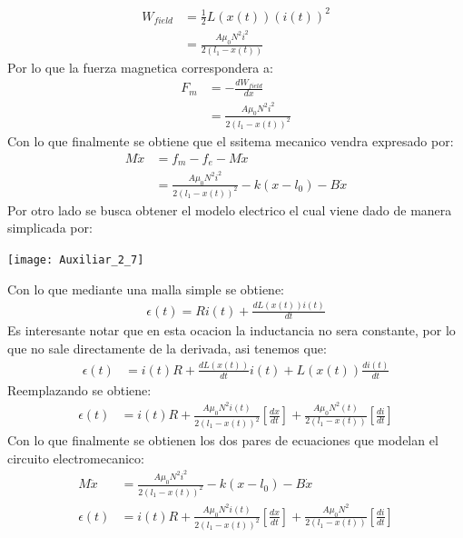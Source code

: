 \documentclass[
  11pt,
  letterpaper,
   addpoints,
   answers
  ]{exam}
\begin{document}
\begin{questions}
\begin{solution}
    \begin{align}
        W_{field} &= \frac{1}{2}L(x(t))(i(t))^{2}\\
                 &= \frac{A\mu_{0}N^{2}i^{2}}{2(l_{1}-x(t))}
    \end{align}
    Por lo que la fuerza magnetica correspondera a:
    \begin{align}
        F_{m} &= -\frac{dW_{field}}{dx}\\
              &= \frac{A\mu_{0}N^{2}i^{2}}{2(l_{1}-x(t))^{2}}
    \end{align}
    Con lo que finalmente se obtiene que el ssitema mecanico vendra expresado por:
    \begin{align}
        M\ddot{x} &= f_{m} - f_{e} - M\dot{x}\\
                  &=\frac{A\mu_{0}N^{2}i^{2}}{2(l_{1}-x(t))^{2}} - k(x-l_{0}) - B\dot{x}
    \end{align}
    Por otro lado se busca obtener el modelo electrico el cual viene dado de manera simplicada por:
    \begin{center}
        \texttt{[image: Auxiliar\_2\_7]}
    \end{center}
    Con lo que mediante una malla simple se obtiene:
    \begin{align}
        \epsilon(t) = Ri(t) + \frac{d L(x(t))i(t)}{dt}
    \end{align}
    Es interesante notar que en esta ocacion la inductancia no sera constante, por lo que no sale directamente de la derivada, asi tenemos que:
    \begin{align}
        \epsilon(t) &= i(t)R + \frac{dL(x(t))}{dt}i(t) + L(x(t))\frac{d i(t)}{dt}
    \end{align}
    Reemplazando se obtiene:
    \begin{align}
        \epsilon(t) &= i(t)R + \frac{A\mu_{0}N^{2}i(t)}{2(l_{1}-x(t))^{2}}\left[\frac{dx}{dt}\right] + \frac{A\mu_{0}N^{2}(t)}{2(l_{1}-x(t))}\left[\frac{di}{dt}\right]
    \end{align}
    Con lo que finalmente se obtienen los dos pares de ecuaciones que modelan el circuito electromecanico:
    \begin{align}
        M\ddot{x} &= \frac{A\mu_{0}N^{2}i^{2}}{2(l_{1}-x(t))^{2}} - k(x-l_{0}) - B\dot{x}\\
        \epsilon(t) &= i(t)R + \frac{A\mu_{0}N^{2}i(t)}{2(l_{1}-x(t))^{2}}\left[\frac{dx}{dt}\right] + \frac{A\mu_{0}N^{2}}{2(l_{1}-x(t))}\left[\frac{di}{dt}\right]
    \end{align}
 \end{solution}

\end{questions}
\end{document}

